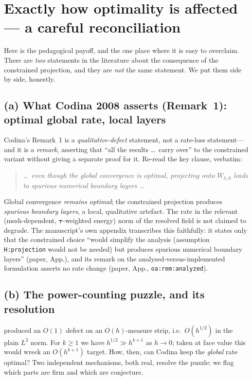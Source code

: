 \documentclass[11pt]{article}
\theoremstyle{plain}
\theoremstyle{definition}
\theoremstyle{remark}
\begin{document}
\section{Exactly how optimality is affected --- a careful reconciliation}
\label{sec:optimality}

Here is the pedagogical payoff, and the one place where it is easy to
overclaim. There are \emph{two} statements in the literature about the
consequence of the constrained projection, and they are \emph{not} the
same statement. We put them side by side, honestly.

\subsection{(a) What Codina 2008 asserts (Remark~1): optimal global rate, local layers}

Codina's Remark~1 is a \emph{qualitative-defect} statement, not a
rate-loss statement---and it is a \emph{remark}, asserting that ``all the
results \dots\ carry over'' to the constrained variant without giving a
separate proof for it. Re-read the key clause, verbatim:

\begin{quote}\itshape
\dots\ even though the global convergence is optimal, projecting onto
$W_{h,0}$ leads to spurious numerical boundary layers \dots
\end{quote}

Global convergence \emph{remains optimal}; the constrained projection
produces \emph{spurious boundary layers}, a local, qualitative artefact.
The rate in the relevant (mesh-dependent, $\bm\tau$-weighted energy)
norm of the resolved field is not claimed to degrade. The manuscript's
own appendix transcribes this faithfully: it states only that the
constrained choice ``would simplify the analysis (assumption
\texttt{H:projection} would not be needed) but produces spurious
numerical boundary layers'' (paper, App.), and its remark on the
analysed-versus-implemented formulation asserts no rate change (paper,
App., \texttt{oa:rem:analyzed}).

\subsection{(b) The power-counting puzzle, and its resolution}

 produced an $O(1)$ defect on an $O(h)$-measure strip,
i.e.\ $O(h^{1/2})$ in the plain $L^2$ norm. For $k\ge1$ we have
$h^{1/2}\gg h^{k+1}$ as $h\to0$; taken at face value this would wreck an
$O(h^{k+1})$ target. How, then, can Codina keep the \emph{global} rate
optimal? Two independent mechanisms, both real, resolve the puzzle;
we flag which parts are firm and which are conjecture.
\end{document}
